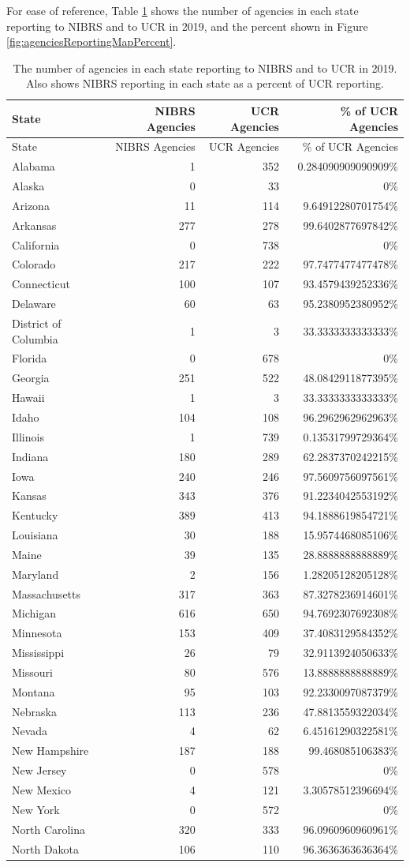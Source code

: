 \documentclass[
  12pt,
  openany]{book}
\begin{document}
For ease of reference, Table \ref{tab:agenciesReportingTable} shows the number of agencies in each state reporting to NIBRS and to UCR in 2019, and the percent shown in Figure \ref{fig:agenciesReportingMapPercent}.

\begin{longtable}[]{@{}lrrr@{}}
\caption{\label{tab:agenciesReportingTable}The number of agencies in each state reporting to NIBRS and to UCR in 2019. Also shows NIBRS reporting in each state as a percent of UCR reporting.}\tabularnewline
\toprule
State & NIBRS Agencies & UCR Agencies & \% of UCR Agencies\tabularnewline
\midrule
\endfirsthead
\toprule
State & NIBRS Agencies & UCR Agencies & \% of UCR Agencies\tabularnewline
\midrule
\endhead
Alabama & 1 & 352 & 0.284090909090909\%\tabularnewline
Alaska & 0 & 33 & 0\%\tabularnewline
Arizona & 11 & 114 & 9.64912280701754\%\tabularnewline
Arkansas & 277 & 278 & 99.6402877697842\%\tabularnewline
California & 0 & 738 & 0\%\tabularnewline
Colorado & 217 & 222 & 97.7477477477478\%\tabularnewline
Connecticut & 100 & 107 & 93.4579439252336\%\tabularnewline
Delaware & 60 & 63 & 95.2380952380952\%\tabularnewline
District of Columbia & 1 & 3 & 33.3333333333333\%\tabularnewline
Florida & 0 & 678 & 0\%\tabularnewline
Georgia & 251 & 522 & 48.0842911877395\%\tabularnewline
Hawaii & 1 & 3 & 33.3333333333333\%\tabularnewline
Idaho & 104 & 108 & 96.2962962962963\%\tabularnewline
Illinois & 1 & 739 & 0.13531799729364\%\tabularnewline
Indiana & 180 & 289 & 62.2837370242215\%\tabularnewline
Iowa & 240 & 246 & 97.5609756097561\%\tabularnewline
Kansas & 343 & 376 & 91.2234042553192\%\tabularnewline
Kentucky & 389 & 413 & 94.1888619854721\%\tabularnewline
Louisiana & 30 & 188 & 15.9574468085106\%\tabularnewline
Maine & 39 & 135 & 28.8888888888889\%\tabularnewline
Maryland & 2 & 156 & 1.28205128205128\%\tabularnewline
Massachusetts & 317 & 363 & 87.3278236914601\%\tabularnewline
Michigan & 616 & 650 & 94.7692307692308\%\tabularnewline
Minnesota & 153 & 409 & 37.4083129584352\%\tabularnewline
Mississippi & 26 & 79 & 32.9113924050633\%\tabularnewline
Missouri & 80 & 576 & 13.8888888888889\%\tabularnewline
Montana & 95 & 103 & 92.2330097087379\%\tabularnewline
Nebraska & 113 & 236 & 47.8813559322034\%\tabularnewline
Nevada & 4 & 62 & 6.45161290322581\%\tabularnewline
New Hampshire & 187 & 188 & 99.468085106383\%\tabularnewline
New Jersey & 0 & 578 & 0\%\tabularnewline
New Mexico & 4 & 121 & 3.30578512396694\%\tabularnewline
New York & 0 & 572 & 0\%\tabularnewline
North Carolina & 320 & 333 & 96.0960960960961\%\tabularnewline
North Dakota & 106 & 110 & 96.3636363636364\%\tabularnewline

\end{longtable}
\end{document}
